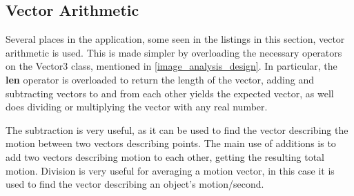 \subsection{Vector Arithmetic}
Several places in the application, some seen in the listings in this section, vector arithmetic is used. This is
made simpler by overloading the necessary operators on the Vector3 class, mentioned in \autoref{image_analysis_design}.
In particular, the \textbf{len} operator is overloaded to return the length of the vector, 
adding and subtracting vectors to and from each other yields the expected vector, as well does dividing or multiplying
the vector with any real number.

The subtraction is very useful, as it can be used to find the vector describing the motion between two vectors describing
points. The main use of additions is to add two vectors describing motion to each other, getting the resulting total motion.
Division is very useful for averaging a motion vector, in this case it is used to find the vector describing an object's
motion/second.
